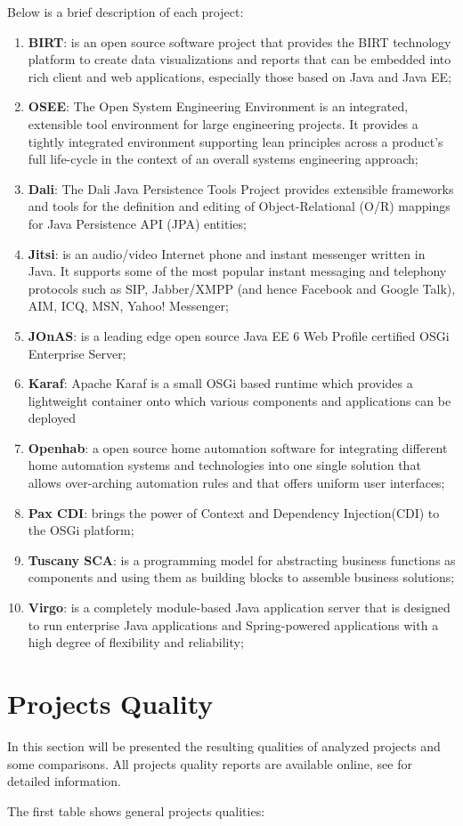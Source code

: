 Below is a brief description of each project:

\begin{enumerate}
\item \textbf{BIRT}: is an open source software project that provides the BIRT technology platform to create data visualizations and reports that can be embedded into rich client and web applications, especially those based on Java and Java EE;
\item \textbf{OSEE}: The Open System Engineering Environment is an integrated, extensible tool environment for large engineering projects. It provides a tightly integrated environment supporting lean principles across a product's full life-cycle in the context of an overall systems engineering approach;
\item \textbf{Dali}: The Dali Java Persistence Tools Project provides extensible frameworks and tools for the definition and editing of Object-Relational (O/R) mappings for Java Persistence API (JPA) entities;
\item \textbf{Jitsi}: is an audio/video Internet phone and instant messenger written in Java. It supports some of the most popular instant messaging and telephony protocols such as SIP, Jabber/XMPP (and hence Facebook and Google Talk), AIM, ICQ, MSN, Yahoo! Messenger;
\item \textbf{JOnAS}: is a leading edge open source Java EE 6 Web Profile certified OSGi Enterprise Server;
\item \textbf{Karaf}: Apache Karaf is a small OSGi based runtime which provides a lightweight container onto which various components and applications can be deployed
\item \textbf{Openhab}: a open source home automation software for integrating different home automation systems and technologies into one single solution that allows over-arching automation rules and that offers uniform user interfaces;
\item \textbf{Pax CDI}: brings the power of Context and Dependency Injection(CDI) to the OSGi platform; 
\item \textbf{Tuscany SCA}: is a programming model for abstracting business functions as components and using them as building blocks to assemble business solutions; 
\item \textbf{Virgo}: is a completely module-based Java application server that is designed to run enterprise Java applications and Spring-powered applications with a high degree of flexibility and reliability; 
\end{enumerate}


\section{Projects Quality}
In this section will be presented the resulting qualities of analyzed projects and some comparisons. All projects quality reports are available online, see \cite{intrabundle reports 2014} for detailed information.

The first table shows general projects qualities:




